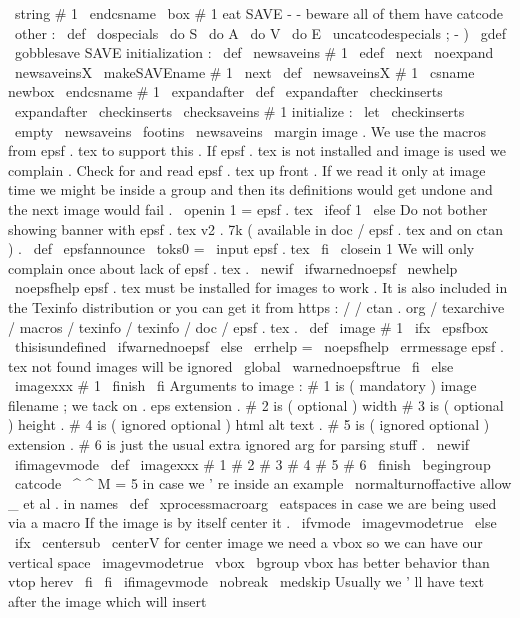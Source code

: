 {{{{{\
string
#
1
\
endcsname
{
\
box
#
1
}
%
}
%
eat
SAVE
-
-
beware
all
of
them
have
catcode
\
other
:
{
\
def
\
dospecials
{
\
do
S
\
do
A
\
do
V
\
do
E
}
\
uncatcodespecials
%
;
-
)
\
gdef
\
gobblesave
SAVE
{
}
}
%
initialization
:
\
def
\
newsaveins
#
1
{
%
\
edef
\
next
{
\
noexpand
\
newsaveinsX
\
makeSAVEname
#
1
}
%
\
next
}
\
def
\
newsaveinsX
#
1
{
%
\
csname
newbox
\
endcsname
#
1
%
\
expandafter
\
def
\
expandafter
\
checkinserts
\
expandafter
{
\
checkinserts
\
checksaveins
#
1
}
%
}
%
initialize
:
\
let
\
checkinserts
\
empty
\
newsaveins
\
footins
\
newsaveins
\
margin
%
image
.
We
use
the
macros
from
epsf
.
tex
to
support
this
.
%
If
epsf
.
tex
is
not
installed
and
image
is
used
we
complain
.
%
%
Check
for
and
read
epsf
.
tex
up
front
.
If
we
read
it
only
at
image
%
time
we
might
be
inside
a
group
and
then
its
definitions
would
get
%
undone
and
the
next
image
would
fail
.
\
openin
1
=
epsf
.
tex
\
ifeof
1
\
else
%
Do
not
bother
showing
banner
with
epsf
.
tex
v2
.
7k
(
available
in
%
doc
/
epsf
.
tex
and
on
ctan
)
.
\
def
\
epsfannounce
{
\
toks0
=
}
%
\
input
epsf
.
tex
\
fi
\
closein
1
%
%
We
will
only
complain
once
about
lack
of
epsf
.
tex
.
\
newif
\
ifwarnednoepsf
\
newhelp
\
noepsfhelp
{
epsf
.
tex
must
be
installed
for
images
to
work
.
It
is
also
included
in
the
Texinfo
distribution
or
you
can
get
it
from
https
:
/
/
ctan
.
org
/
texarchive
/
macros
/
texinfo
/
texinfo
/
doc
/
epsf
.
tex
.
}
%
\
def
\
image
#
1
{
%
\
ifx
\
epsfbox
\
thisisundefined
\
ifwarnednoepsf
\
else
\
errhelp
=
\
noepsfhelp
\
errmessage
{
epsf
.
tex
not
found
images
will
be
ignored
}
%
\
global
\
warnednoepsftrue
\
fi
\
else
\
imagexxx
#
1
\
finish
\
fi
}
%
%
Arguments
to
image
:
%
#
1
is
(
mandatory
)
image
filename
;
we
tack
on
.
eps
extension
.
%
#
2
is
(
optional
)
width
#
3
is
(
optional
)
height
.
%
#
4
is
(
ignored
optional
)
html
alt
text
.
%
#
5
is
(
ignored
optional
)
extension
.
%
#
6
is
just
the
usual
extra
ignored
arg
for
parsing
stuff
.
\
newif
\
ifimagevmode
\
def
\
imagexxx
#
1
#
2
#
3
#
4
#
5
#
6
\
finish
{
\
begingroup
\
catcode
\
^
^
M
=
5
%
in
case
we
'
re
inside
an
example
\
normalturnoffactive
%
allow
_
et
al
.
in
names
\
def
\
xprocessmacroarg
{
\
eatspaces
}
%
in
case
we
are
being
used
via
a
macro
%
If
the
image
is
by
itself
center
it
.
\
ifvmode
\
imagevmodetrue
\
else
\
ifx
\
centersub
\
centerV
%
for
center
image
we
need
a
vbox
so
we
can
have
our
vertical
space
\
imagevmodetrue
\
vbox
\
bgroup
%
vbox
has
better
behavior
than
vtop
herev
\
fi
\
fi
%
\
ifimagevmode
\
nobreak
\
medskip
%
Usually
we
'
ll
have
text
after
the
image
which
will
insert
}}}}}
